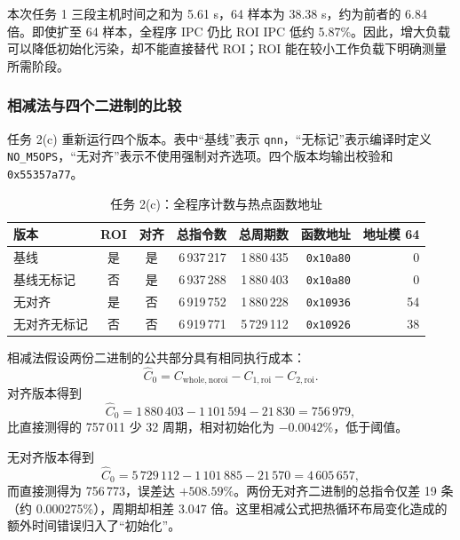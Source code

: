 \documentclass[12pt,a4paper,fontset=mac]{ctexart}
\begin{document}
本次任务 1 三段主机时间之和为 5.61 s，64 样本为 38.38 s，约为前者的 6.84 倍。即使扩至 64 样本，全程序 IPC 仍比 ROI IPC 低约 5.87\%。因此，增大负载可以降低初始化污染，却不能直接替代 ROI；ROI 能在较小工作负载下明确测量所需阶段。

\subsubsection{相减法与四个二进制的比较}
任务 2(c) 重新运行四个版本。表中“基线”表示 \texttt{qnn}，“无标记”表示编译时定义 \texttt{NO\_M5OPS}，“无对齐”表示不使用强制对齐选项。四个版本均输出校验和 \texttt{0x55357a77}。
\begin{table}[H]\centering\scriptsize
\caption{任务 2(c)：全程序计数与热点函数地址}\label{tab:alignment}
\begin{tabular}{lccrrrr}\toprule
版本 & ROI & 对齐 & 总指令数 & 总周期数 & 函数地址 & 地址模 64 \\\midrule
基线 & 是 & 是 & 6\,937\,217 & 1\,880\,435 & \texttt{0x10a80} & 0 \\
基线无标记 & 否 & 是 & 6\,937\,288 & 1\,880\,403 & \texttt{0x10a80} & 0 \\
无对齐 & 是 & 否 & 6\,919\,752 & 1\,880\,228 & \texttt{0x10936} & 54 \\
无对齐无标记 & 否 & 否 & 6\,919\,771 & 5\,729\,112 & \texttt{0x10926} & 38 \\
\bottomrule\end{tabular}\end{table}

相减法假设两份二进制的公共部分具有相同执行成本：
\[
\widehat C_0=C_{\mathrm{whole,noroi}}-C_{1,\mathrm{roi}}-C_{2,\mathrm{roi}}.
\]
对齐版本得到
\[
\widehat C_0=1\,880\,403-1\,101\,594-21\,830=756\,979,
\]
比直接测得的 757\,011 少 32 周期，相对初始化为 $-0.0042\%$，低于阈值。

无对齐版本得到
\[
\widehat C_0=5\,729\,112-1\,101\,885-21\,570=4\,605\,657,
\]
而直接测得为 756\,773，误差达 $+508.59\%$。两份无对齐二进制的总指令仅差 19 条（约 0.000275\%），周期却相差 3.047 倍。这里相减公式把热循环布局变化造成的额外时间错误归入了“初始化”。
\end{document}
